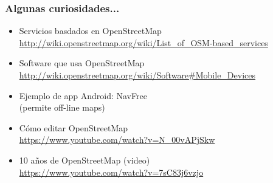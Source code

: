 \begin{frame}
\frametitle{Algunas curiosidades...}

\begin{itemize}
\item Servicios basdados en OpenStreetMap \\
  \url{http://wiki.openstreetmap.org/wiki/List_of_OSM-based_services} \\
\item Software que usa OpenStreetMap \\
  \url{http://wiki.openstreetmap.org/wiki/Software#Mobile_Devices} \\
\item Ejemplo de app Android: NavFree \\
  (permite off-line maps) \\
\item Cómo editar OpenStreetMap \\
  \url{https://www.youtube.com/watch?v=N_00vAPjSkw} \\
\item 10 años de OpenStreetMap (video) \\
  \url{https://www.youtube.com/watch?v=7sC83j6vzjo} \\
\end{itemize}

\end{frame}

